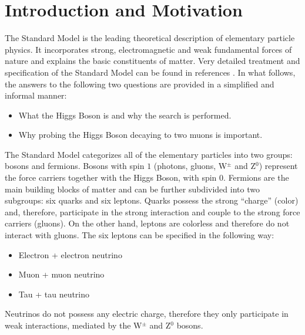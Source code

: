 \section{Introduction and Motivation} \label{section:higgs_introduction}
The Standard Model is the leading theoretical description of elementary particle physics. It incorporates strong, electromagnetic and weak fundamental forces of nature and explains the basic constituents of matter. Very detailed treatment and specification of the Standard Model can be found in references \cite{Peskin,Griffiths,Nikhef}. In what follows, the answers to the following two questions are provided in a simplified and informal manner:
\begin{itemize}
    \item What the Higgs Boson is and why the search is performed.
    \item Why probing the Higgs Boson decaying to two muons is important.
\end{itemize}

The Standard Model categorizes all of the elementary particles into two groups: bosons and fermions. Bosons with spin $1$ (photons, gluons, W$^{\pm}$ and Z$^{0}$) represent the force carriers together with the Higgs Boson, with spin $0$. Fermions are the main building blocks of matter and can be further subdivided into two subgroups: six quarks and six leptons. Quarks possess the strong ``charge'' (color) and, therefore, participate in the strong interaction and couple to the strong force carriers (gluons). On the other hand, leptons are colorless and therefore do not interact with gluons. The six leptons can be specified in the following way:
\begin{itemize}
    \item Electron + electron neutrino
    \item Muon + muon neutrino
    \item Tau + tau neutrino
\end{itemize}
Neutrinos do not possess any electric charge, therefore they only participate in weak interactions, mediated by the W$^{\pm}$ and Z$^{0}$ bosons.

